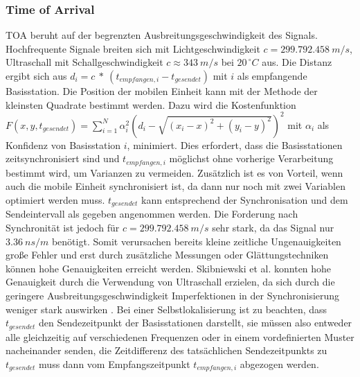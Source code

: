 \subsubsection{Time of Arrival}
TOA beruht auf der begrenzten Ausbreitungsgeschwindigkeit des Signals.
Hochfrequente Signale breiten sich mit Lichtgeschwindigkeit $c = 299.792.458\ m/s$, Ultraschall mit Schallgeschwindigkeit $c \approx 343\ m/s$ bei $20^{\ \circ}C$ aus. 
Die Distanz ergibt sich aus $d_i = c\ *\ (t_{empfangen,i} - t_{gesendet})$ mit $i$ als empfangende Basisstation.
Die Position der mobilen Einheit kann mit der Methode der kleinsten Quadrate bestimmt werden.
Dazu wird die Kostenfunktion $F(x,y,t_{gesendet}) = \sum_{i=1}^{N} {\alpha}^2_i (d_i - \sqrt{(x_i - x)^2 + (y_i - y)^2})^2$ mit ${\alpha}_i$ als Konfidenz von Basisstation $i$, minimiert. Dies erfordert, dass die Basisstationen zeitsynchronisiert sind und $t_{empfangen,i}$ möglichst ohne vorherige Verarbeitung bestimmt wird, um Varianzen zu vermeiden. 
Zusätzlich ist es von Vorteil, wenn auch die mobile Einheit synchronisiert ist, da dann nur noch mit zwei Variablen optimiert werden muss. 
$t_{gesendet}$ kann entsprechend der Synchronisation und dem Sendeintervall als gegeben angenommen werden. 
Die Forderung nach Synchronität ist jedoch für $c = 299.792.458\ m/s$ sehr stark, da das Signal nur $3.36\ ns/m$ benötigt. 
Somit verursachen bereits kleine zeitliche Ungenauigkeiten große Fehler und erst durch zusätzliche Messungen oder Glättungstechniken können hohe Genauigkeiten erreicht werden. 
Skibniewski et al. konnten hohe Genauigkeit durch die Verwendung von Ultraschall erzielen, da sich durch die geringere Ausbreitungsgeschwindigkeit Imperfektionen in der Synchronisierung weniger stark auswirken \cite{skibniewski2009simulation}. 
Bei einer Selbstlokalisierung ist zu beachten, dass $t_{gesendet}$ den Sendezeitpunkt der Basisstationen darstellt, sie müssen also entweder alle gleichzeitig auf verschiedenen Frequenzen oder in einem vordefinierten Muster nacheinander senden, die Zeitdifferenz des tatsächlichen Sendezeitpunkts zu $t_{gesendet}$ muss dann vom Empfangszeitpunkt $t_{empfangen,i}$ abgezogen werden. 



